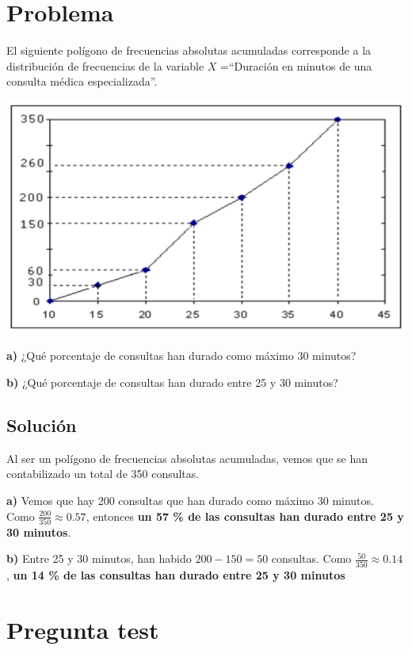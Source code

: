 \documentclass[
]{book}
\begin{document}
\hypertarget{problema-2}{%
\section{Problema}\label{problema-2}}

El siguiente polígono de frecuencias absolutas acumuladas corresponde a la distribución de frecuencias de la variable \(X\) =``Duración en minutos de una consulta médica especializada''.

\includegraphics[width=19.47in]{img/2_1}

\textbf{a)} ¿Qué porcentaje de consultas han durado como máximo 30 minutos?

\textbf{b)} ¿Qué porcentaje de consultas han durado entre 25 y 30 minutos?

\hypertarget{soluciuxf3n-21}{%
\subsection{Solución}\label{soluciuxf3n-21}}

Al ser un polígono de frecuencias absolutas acumuladas, vemos que se han contabilizado un total de 350 consultas.

\textbf{a)} Vemos que hay 200 consultas que han durado como máximo 30 minutos. Como \(\frac{200}{350} \approx 0.57\), entonces \textbf{un 57 \% de las consultas han durado entre 25 y 30 minutos}.

\textbf{b)} Entre 25 y 30 minutos, han habido \(200 - 150 = 50\) consultas. Como \(\frac{50}{350} \approx 0.14\), \textbf{un 14 \% de las consultas han durado entre 25 y 30 minutos}

\hypertarget{pregunta-test-19}{%
\section{Pregunta test}\label{pregunta-test-19}}
\end{document}
